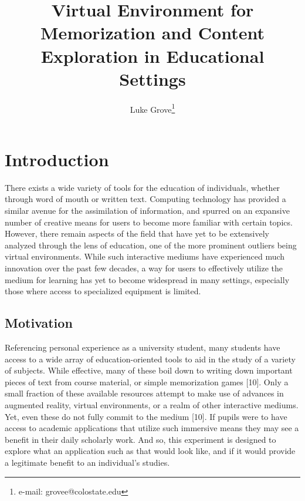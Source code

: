 \documentclass{vgtc}                          %
\title{Virtual Environment for Memorization and Content Exploration in Educational Settings}
\author{Luke Grove\thanks{e-mail: grovee@colostate.edu}}
\affiliation{\scriptsize Undergraduate Student}
\begin{document}


\maketitle

\section{Introduction} %
There exists a wide variety of tools for the education of individuals, whether through word of mouth or written text. Computing technology has provided a similar avenue for the assimilation of information, and spurred on an expansive number of creative means for users to become more familiar with certain topics. However, there remain aspects of the field that have yet to be extensively analyzed through the lens of education, one of the more prominent outliers being virtual environments. While such interactive mediums have experienced much innovation over the past few decades, a way for users to effectively utilize the medium for learning has yet to become widespread in many settings, especially those where access to specialized equipment is limited. 

\subsection{Motivation}

Referencing personal experience as a university student, many students have access to a wide array of education-oriented tools to aid in the study of a variety of subjects. While effective, many of these boil down to writing down important pieces of text from course material, or simple memorization games [10]. Only a small fraction of these available resources attempt to make use of advances in augmented reality, virtual environments, or a realm of other interactive mediums. Yet, even these  do not fully commit to the medium [10]. If pupils were to have access to academic applications that utilize such immersive means they may see a benefit in their daily scholarly work. And so, this experiment is designed to explore what an application such as that would look like, and if it would provide a legitimate benefit to an individual's studies. 
\end{document}
